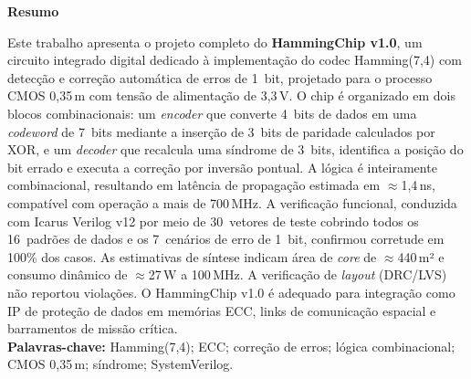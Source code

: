 \documentclass[12pt,a4paper]{article}
\begin{document}
\newpage

\begin{center}
  {\large\bfseries\color{hammingblue} Resumo}
\end{center}
\begin{unidadebox}[Resumo]
Este trabalho apresenta o projeto completo do \textbf{HammingChip v1.0}, um circuito integrado digital dedicado à implementação do codec Hamming(7,4) com detecção e correção automática de erros de 1~bit, projetado para o processo CMOS 0,35\,\textmu m com tensão de alimentação de 3,3\,V. O chip é organizado em dois blocos combinacionais: um \textit{encoder} que converte 4~bits de dados em uma \textit{codeword} de 7~bits mediante a inserção de 3~bits de paridade calculados por XOR, e um \textit{decoder} que recalcula uma síndrome de 3~bits, identifica a posição do bit errado e executa a correção por inversão pontual. A lógica é inteiramente combinacional, resultando em latência de propagação estimada em $\approx$1,4\,ns, compatível com operação a mais de 700\,MHz. A verificação funcional, conduzida com Icarus Verilog v12 por meio de 30~vetores de teste cobrindo todos os 16~padrões de dados e os 7~cenários de erro de 1~bit, confirmou corretude em 100\% dos casos. As estimativas de síntese indicam área de \textit{core} de $\approx$440\,\textmu m² e consumo dinâmico de $\approx$27\,\textmu W a 100\,MHz. A verificação de \textit{layout} (DRC/LVS) não reportou violações. O HammingChip v1.0 é adequado para integração como IP de proteção de dados em memórias ECC, links de comunicação espacial e barramentos de missão crítica.\\[4pt]
\textbf{Palavras-chave:} Hamming(7,4); ECC; correção de erros; lógica combinacional; CMOS 0,35\,\textmu m; síndrome; SystemVerilog.
\end{unidadebox}
\end{document}
